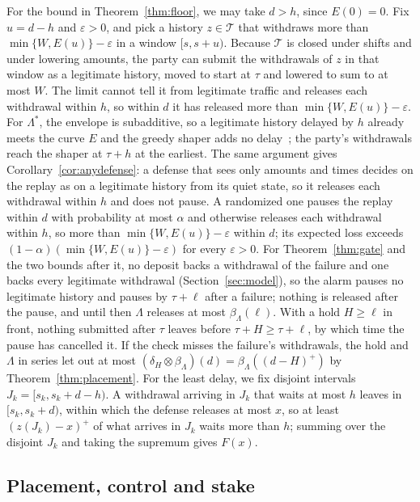 \documentclass[conference,compsoc]{IEEEtran}
\numberwithin{equation}{section}
\theoremstyle{plain}
\theoremstyle{definition}
\theoremstyle{remark}
\newcommand{\Tset}{\mathcal{T}}
\begin{document}
For the bound in Theorem~\ref{thm:floor}, we may take $d > h$, since $E(0) = 0$. Fix $u = d - h$ and $\varepsilon > 0$, and pick a history $z \in \Tset$ that withdraws more than $\min\{W, E(u)\} - \varepsilon$ in a window $[s, s + u)$. Because $\Tset$ is closed under shifts and under lowering amounts, the party can submit the withdrawals of $z$ in that window as a legitimate history, moved to start at $\tau$ and lowered to sum to at most $W$. The limit cannot tell it from legitimate traffic and releases each withdrawal within $h$, so within $d$ it has released more than $\min\{W, E(u)\} - \varepsilon$. For $\Lambda^*$, the envelope is subadditive, so a legitimate history delayed by $h$ already meets the curve $E$ and the greedy shaper adds no delay~\cite[Thm.~1.5.1]{leboudec2001}; the party's withdrawals reach the shaper at $\tau + h$ at the earliest. The same argument gives Corollary~\ref{cor:anydefense}: a defense that sees only amounts and times decides on the replay as on a legitimate history from its quiet state, so it releases each withdrawal within $h$ and does not pause. A randomized one pauses the replay within $d$ with probability at most $\alpha$ and otherwise releases each withdrawal within $h$, so more than $\min\{W, E(u)\} - \varepsilon$ within $d$; its expected loss exceeds $(1-\alpha)(\min\{W, E(u)\} - \varepsilon)$ for every $\varepsilon > 0$. For Theorem~\ref{thm:gate} and the two bounds after it, no deposit backs a withdrawal of the failure and one backs every legitimate withdrawal (Section~\ref{sec:model}), so the alarm pauses no legitimate history and pauses by $\tau + \ell$ after a failure; nothing is released after the pause, and until then $\Lambda$ releases at most $\beta_\Lambda(\ell)$. With a hold $H \ge \ell$ in front, nothing submitted after $\tau$ leaves before $\tau + H \ge \tau + \ell$, by which time the pause has cancelled it. If the check misses the failure's withdrawals, the hold and $\Lambda$ in series let out at most $(\delta_H \otimes \beta_\Lambda)(d) = \beta_\Lambda((d-H)^+)$ by Theorem~\ref{thm:placement}. For the least delay, we fix disjoint intervals $J_k = [s_k, s_k + d - h)$. A withdrawal arriving in $J_k$ that waits at most $h$ leaves in $[s_k, s_k + d)$, within which the defense releases at most $x$, so at least $(z(J_k) - x)^+$ of what arrives in $J_k$ waits more than $h$; summing over the disjoint $J_k$ and taking the supremum gives $F(x)$.

\subsection{Placement, control and stake}\label{app:placeproof}
\end{document}
